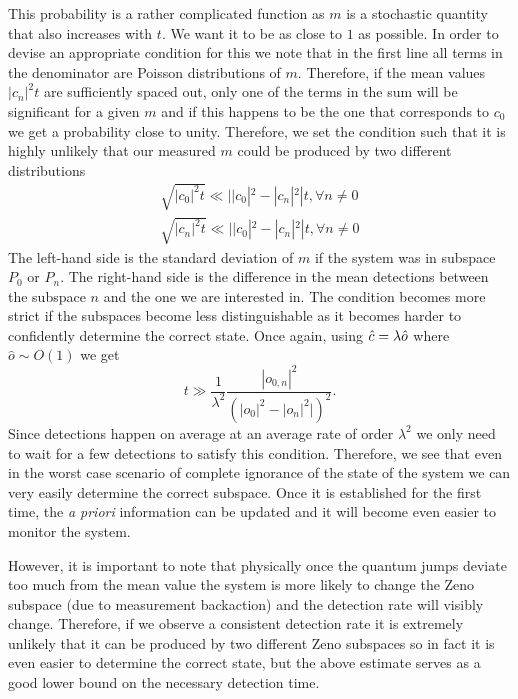 This probability is a rather complicated function as $m$ is a
stochastic quantity that also increases with $t$. We want it to be as
close to $1$ as possible. In order to devise an appropriate condition
for this we note that in the first line all terms in the denominator
are Poisson distributions of $m$. Therefore, if the mean values
$|c_n|^2 t$ are sufficiently spaced out, only one of the terms in the
sum will be significant for a given $m$ and if this happens to be the
one that corresponds to $c_0$ we get a probability close to
unity. Therefore, we set the condition such that it is highly unlikely
that our measured $m$ could be produced by two different distributions
\begin{align}
  \sqrt{|c_0|^2 t} \ll ||c_0|^2 - |c_n|^2| t, \forall n \ne 0 \\
  \sqrt{|c_n|^2 t} \ll ||c_0|^2 - |c_n|^2| t, \forall n \ne 0
\end{align}
The left-hand side is the standard deviation of $m$ if the system was
in subspace $P_0$ or $P_n$. The right-hand side is the difference in
the mean detections between the subspace $n$ and the one we are
interested in. The condition becomes more strict if the subspaces
become less distinguishable as it becomes harder to confidently
determine the correct state. Once again, using $\hat{c} = \lambda \hat{o}$
where $\hat{o} \sim O(1)$ we get
\begin{equation}
  t \gg \frac{1}{\lambda^2} \frac{|o_{0,n}|^2} {(|o_0|^2 - |o_n|^2|)^2}.
\end{equation}
Since detections happen on average at an average rate of order
$\lambda^2$ we only need to wait for a few detections to satisfy this
condition. Therefore, we see that even in the worst case scenario of
complete ignorance of the state of the system we can very easily
determine the correct subspace. Once it is established for the first
time, the \emph{a priori} information can be updated and it will
become even easier to monitor the system.

However, it is important to note that physically once the quantum
jumps deviate too much from the mean value the system is more likely
to change the Zeno subspace (due to measurement backaction) and the
detection rate will visibly change. Therefore, if we observe a
consistent detection rate it is extremely unlikely that it can be
produced by two different Zeno subspaces so in fact it is even easier
to determine the correct state, but the above estimate serves as a
good lower bound on the necessary detection time.

